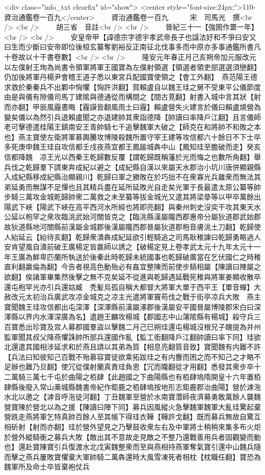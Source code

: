 <div class="info_txt clearfix" id="show">
<center style="font-size:24px;">110-資治通鑑卷一百九</center>
  　　資治通鑑卷一百九　　　宋　司馬光　撰<br />
<br />
　　胡三省　音註<br />
<br />
　　晉紀三十一【強圉作噩一年】<br />
<br />
　　安皇帝甲【諱德宗字德宇孝武帝長子也諡法好和不爭曰安又曰生而少斷曰安帝即位後桓玄纂奪劉裕反正南征北伐事多而中原亦多事通鑑所書凡十卷故以十干書卷數】<br />
<br />
　　隆安元年春正月己亥朔帝加元服改元以左僕射王珣為尚書令領軍將軍王國寶為左僕射領選【領選者領吏部選選須戀翻】仍加後將軍丹楊尹會稽王道子悉以東宮兵配國寶使領之【會工外翻】　燕范陽王德求救於秦秦兵不出鄴中恟懼【恟許洪翻】賀賴盧自以魏王珪之舅不受東平公儀節度由是與儀有隙儀司馬丁建隂與德通從而構間之【間古莧翻】射書入城中言其狀【射而亦翻】甲辰風霾晝晦【霾謨皆翻風雨土曰霾】賴盧營失火建言於儀曰賴盧燒營為變矣儀以為然引兵退賴盧聞之亦退建帥其衆詣德降【帥讀曰率降戶江翻】且言儀師老可擊德遣桂陽王鎮南安王青帥騎七千追擊魏軍大破之【師克在和將帥不和敗之本也】燕主寶使左衛將軍慕輿騰攻博陵殺魏所置守宰王建等攻信都六十餘日不下士卒多死庚申魏王珪自攻信都壬戌夜燕宜都王鳳踰城犇中山【鳳知珪至膽破而走】癸亥信都降魏　凉王光以西秦王乾歸數反覆【謂乾歸既稱藩於光而悔之也數所角翻】舉兵伐之乾歸羣下請東奔成紀以避之【成紀縣自漢以來屬天水郡治小坑川唐併顯親縣入成紀縣移成紀縣治顯親川】乾歸曰軍之勝敗在於巧拙不在衆寡光兵雖衆而無法其弟延勇而無謀不足憚也且其精兵盡在延所延敗光自走矣光軍于長最遣太原公纂等帥步騎三萬攻金城乾歸帥衆二萬救之未至纂等拔金城光又遣其將梁㳟等以甲卒萬餘出陽武下峽【陽武下峽在高平西河水所經也將即亮翻】與秦州刺史沒奕干攻其東天水公延以枹罕之衆攻臨洮武始河關皆克之【臨洮縣漢屬隴西郡惠帝分屬狄道郡武始郡故狄道縣地河關縣前漢屬金城郡後漢屬隴西郡晉屬狄道郡枹音膚洮土刀翻】乾歸使人紿延云【紿待亥翻】乾歸衆潰犇成紀延欲引輕騎追之司馬耿稚諫曰乾歸勇略過人安肯望風自潰前破王廣楊定皆羸師以誘之【破楊定見上卷孝武太元十九年太元十一年王廣為鮮卑匹蘭所執送於後秦此時乾歸未統國事也乾歸破廣當在乞伏國仁之時稚直利翻羸倫為翻】今告者視高色動殆必有姦宜整陳而前使步騎相屬【陳讀曰陣屬之欲翻】俟諸軍畢集然後擊之無不克矣延不從進與乾歸遇延戰死稚與將軍姜顯收散卒還屯枹罕光亦引兵還姑臧　秃髪烏孤自稱大都督大將軍大單于西平王【單音蟬】大赦改元太初治兵廣武攻凉金城克之凉主光遣將軍竇苟伐之戰于街亭凉兵大敗　燕主寶聞魏王珪攻信都出屯深澤【深澤縣前漢屬涿郡後漢屬安平國晉屬博陵郡宋白曰深澤縣以界内水澤深廣為名】遣趙王麟攻楊城【郡國志中山蒲隂縣有楊城】殺守兵三百寶悉出珍寶及宫人募郡國羣盜以擊魏二月己巳朔珪還屯楊城沒根兄子醜提為并州監軍聞其叔父降燕懼誅帥所部兵還國作亂【監工銜翻降戶江翻帥讀曰率下同】珪欲北還遣其國相涉延求和於燕且請以其弟為質【相息亮翻質音致】寶聞魏有内難不許【兵法曰知彼知己百戰不殆慕容寶徒欲乘拓跋珪之有内釁而困之而不知己之才略不足辦也難乃旦翻】使冗從僕射蘭真責珪負恩【冗而隴翻從才用翻】悉發其衆步卒十二萬騎三萬七千屯於曲陽之栢肆【此趙國之下曲陽縣也有栢肆塢隋開皇十六年置栢肆縣後廢入常山槀城縣魏書帝紀作鉅鹿之栢肆塢按地形志鉅鹿郡治曲陽】營於滹沲水北以邀之【滹音呼沲徒河翻】丁丑魏軍至營於水南寶濳師夜濟募勇敢萬餘人襲魏營寶陳於營北以為之援【陳讀曰陣下同】募兵因風縱火急擊魏軍魏軍大亂珪驚起棄營跣走燕將軍乞特真帥百餘人至其帳下得珪衣鞾【鞾許戈翻】既而募兵無故自驚互相斫射【射而亦翻】珪於營外望見之乃擊鼓收衆左右及中軍將士稍稍來集多布火炬於營外縱騎衝之募兵大敗【敵出其不意故走見敵之不整乃還戰善用兵者固觀變而動也】還赴寶陳寶引兵復渡水北戊寅魏整衆而至與燕相持燕軍奪氣寶引還中山魏兵隨而擊之燕兵屢敗寶懼棄大軍帥騎二萬犇還時大風雪凍死者相枕【枕職任翻】寶恐為魏軍所及命士卒皆棄袍仗兵